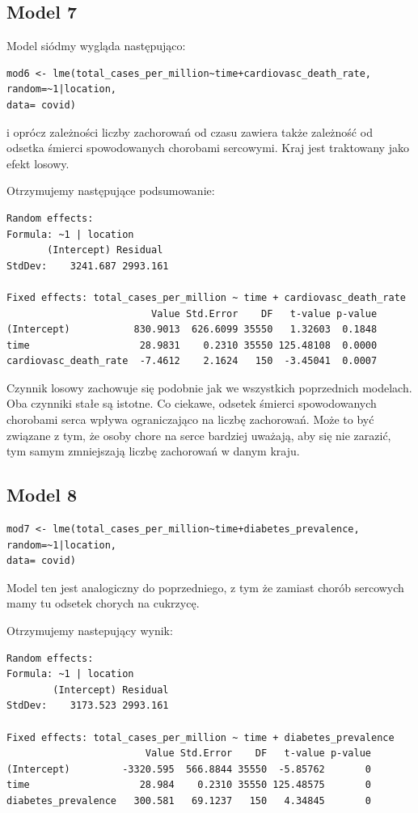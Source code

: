 \documentclass[12pt]{mwbk}
\theoremstyle{plain}
\theoremstyle{definition}
\theoremstyle{remark}
\begin{document}
\subsection{Model 7}

Model siódmy wygląda następująco:

\begin{verbatim}
mod6 <- lme(total_cases_per_million~time+cardiovasc_death_rate,
random=~1|location,
data= covid)
\end{verbatim}

i oprócz zależności liczby zachorowań od czasu zawiera także zależność od odsetka śmierci spowodowanych chorobami sercowymi. Kraj jest traktowany jako efekt losowy.

Otrzymujemy następujące podsumowanie:
\begin{verbatim}
Random effects:
Formula: ~1 | location
       (Intercept) Residual
StdDev:    3241.687 2993.161

Fixed effects: total_cases_per_million ~ time + cardiovasc_death_rate 
                         Value Std.Error    DF   t-value p-value
(Intercept)           830.9013  626.6099 35550   1.32603  0.1848
time                   28.9831    0.2310 35550 125.48108  0.0000
cardiovasc_death_rate  -7.4612    2.1624   150  -3.45041  0.0007
\end{verbatim}

Czynnik losowy zachowuje się podobnie jak we wszystkich poprzednich modelach. Oba czynniki stałe są istotne. Co ciekawe, odsetek śmierci spowodowanych chorobami serca wpływa ograniczająco na liczbę zachorowań. Może to być związane z tym, że osoby chore na serce bardziej uważają, aby się nie zarazić, tym samym zmniejszają liczbę zachorowań w danym kraju.

\subsection{Model 8}

\begin{verbatim}
mod7 <- lme(total_cases_per_million~time+diabetes_prevalence,
random=~1|location,
data= covid)
\end{verbatim}

Model ten jest analogiczny do poprzedniego, z tym że zamiast chorób sercowych mamy tu odsetek chorych na cukrzycę.

Otrzymujemy nastepujący wynik:
\begin{verbatim}
Random effects:
Formula: ~1 | location
        (Intercept) Residual
StdDev:    3173.523 2993.161

Fixed effects: total_cases_per_million ~ time + diabetes_prevalence 
                        Value Std.Error    DF   t-value p-value
(Intercept)         -3320.595  566.8844 35550  -5.85762       0
time                   28.984    0.2310 35550 125.48575       0
diabetes_prevalence   300.581   69.1237   150   4.34845       0
\end{verbatim}
\end{document}
